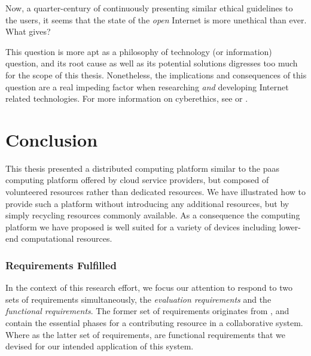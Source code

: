 \documentclass[12pt, titlepage]{uo_temp}
\begin{document}
     Now, a quarter-century of continuously presenting similar ethical guidelines to the
     users, it seems that the state of the \emph{open} Internet is more unethical than
     ever. What gives?

     This question is more apt as a philosophy of technology (or information) question,
     and its root cause as well as its potential solutions digresses too much for the scope
     of this thesis. Nonetheless, the implications and consequences of this question are a
     real impeding factor when researching \emph{and} developing Internet related
     technologies. For more information on cyberethics, see \cite{spinello2010cyberethics}
     or \cite{tavani2010ethics}.

     \chapter{Conclusion}
     This thesis presented a distributed computing platform similar to the \gls{paas}
     computing platform offered by cloud service providers, but composed of volunteered
     resources rather than dedicated resources. We have illustrated how to provide such a
     platform without introducing any additional resources, but by simply recycling
     resources commonly available. As a consequence the computing platform we have
     proposed is well suited for a variety of devices including lower-end computational
     resources. 

     \subsection{Requirements Fulfilled} 
     In the context of this research effort, we focus our attention to respond to two sets
     of requirements simultaneously, the \emph{evaluation requirements} and the
     \emph{functional requirements}. The former set of requirements originates from
     \cite{p2pcollab}, and contain the essential phases for a contributing resource in a
     collaborative system. Where as the latter set of requirements, are functional
     requirements that we devised for our intended application of this system.
\end{document}
